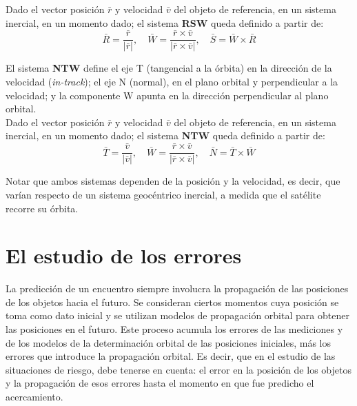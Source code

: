 Dado el vector posici\'on $\bar{r}$ y velocidad $\bar{v}$ del objeto de referencia, en un sistema inercial, en un momento dado; el sistema {\bf{RSW}} queda definido a partir de:\\


\begin{equation}
 \bar{R}=\frac{\bar{r}}{|\bar{r}|}, \quad \bar{W}=\frac{\bar{r}\times\bar{v}}{|\bar{r}\times\bar{v}|}, \quad \bar{S}=\bar{W}\times\bar{R}
\end{equation}

El sistema {\bf{NTW}} define el eje T (tangencial a la \'orbita) en la direcci\'on de la velocidad ({\it{in-track}}); el eje N (normal), en el plano orbital y perpendicular a la velocidad; y la componente W apunta en la direcci\'on perpendicular al plano orbital.\\

Dado el vector posici\'on $\bar{r}$ y velocidad $\bar{v}$ del objeto de referencia, en un sistema inercial, en un momento dado; el sistema {\bf{NTW}} queda definido a partir de:\\

\begin{equation}
 \bar{T}=\frac{\bar{v}}{|\bar{v}|}, \quad \bar{W}=\frac{\bar{r}\times\bar{v}}{|\bar{r}\times\bar{v}|}, \quad \bar{N}=\bar{T}\times\bar{W}
\end{equation}



Notar que ambos sistemas dependen de la posici\'on y la velocidad, es decir, que var\'ian respecto de un sistema geoc\'entrico inercial, a medida que el sat\'elite recorre su \'orbita.\\





\section{El estudio de los errores}

La predicci\'on de un encuentro siempre involucra la propagaci\'on de las posiciones de los objetos hacia el futuro. Se consideran ciertos momentos cuya posici\'on se toma como dato inicial y se utilizan modelos de propagaci\'on orbital para obtener las posiciones en el futuro. Este proceso acumula los errores de las mediciones y de los modelos de la determinaci\'on orbital de las posiciones iniciales, m\'as los errores que introduce la propagaci\'on orbital. Es decir, que en el estudio de las situaciones de riesgo, debe tenerse en cuenta: el error en la posici\'on de los objetos y la propagaci\'on de esos errores hasta el momento en que fue predicho el acercamiento.\\

